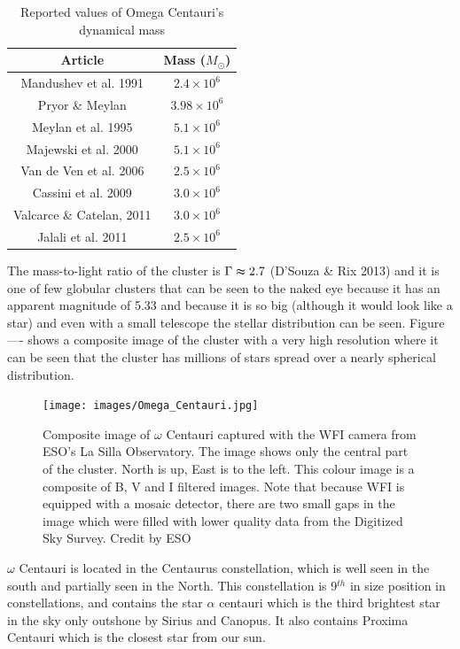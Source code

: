 \begin{table}[H]
\begin{center}
\begin{tabular}{| c | c| }
    \hline
    \textbf{Article} & \textbf{Mass} ($M_{\odot}$) \\ \hline
    Mandushev et al. 1991 & $2.4 \times 10^{6}$  \\ \hline
    Pryor \& Meylan & $3.98 \times 10^{6}$  \\ \hline
    Meylan et al. 1995 & $5.1 \times 10^{6}$  \\ \hline
    Majewski et al. 2000 & $5.1 \times 10^{6}$  \\ \hline
    Van de Ven et al. 2006 & $2.5 \times 10^{6}$  \\ \hline
    Cassini et al. 2009 & $3.0 \times 10^{6}$  \\ \hline
    Valcarce \& Catelan, 2011 & $3.0 \times 10^{6}$  \\ \hline
    Jalali et al. 2011 & $2.5 \times 10^{6}$  \\
    \hline
  \end{tabular} 
\caption[Mass Omega Centauri]{Reported values of Omega Centauri's dynamical mass}
\end{center}
\end{table}

The mass-to-light ratio of the cluster is $\Gamma \thickapprox 2.7$ (D'Souza \& Rix 2013) and it is one of few globular clusters that can be seen to the naked eye because it has an apparent magnitude of 5.33 and because it is so big (although it would look like a star) and even with a small telescope the stellar distribution can be seen. Figure ---- shows a composite image of the cluster with a very high resolution where it can be seen that the cluster has millions of stars spread over a nearly spherical distribution.

\begin{figure}[H]
\centering
\texttt{[image: images/Omega\_Centauri.jpg]}
\caption[Ever]{Composite image of $\omega$ Centauri captured with the WFI camera from ESO's La Silla Observatory. The image shows only the central part of the cluster. North is up, East is to the left. This colour image is a composite of B, V and I filtered images. Note that because WFI is equipped with a mosaic detector, there are two small gaps in the image which were filled with lower quality data from the Digitized Sky Survey. Credit by ESO}
\end{figure}

$\omega$ Centauri is located in the Centaurus constellation, which is well seen in the south and partially seen in the North. This constellation is 9$^{th}$ in size position in constellations, and contains the star $\alpha$ centauri which is the third brightest star in the sky only outshone by Sirius and Canopus. It also contains Proxima Centauri which is the closest star from our sun. 

